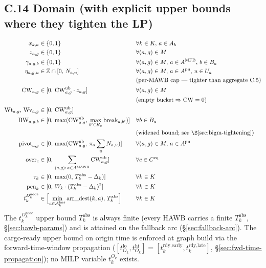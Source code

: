 \documentclass[11pt,a4paper]{article}
\theoremstyle{definition}
\begin{document}
\subsection*{C.14 Domain (with explicit upper bounds where they tighten the LP)}
\label{sec:domain}

\begin{align*}
  x_{k,a}      &\in \{0, 1\}                              & & \forall k \in K,\, a \in A_k \\
  z_{a,g}      &\in \{0, 1\}                              & & \forall (a, g) \in M \\
  \gamma_{a,g,b} &\in \{0, 1\}                            & & \forall (a, g) \in M,\, a \in A^{\text{MFB}},\, b \in B_a \\
  \eta_{a,g,u} &\in \mathbb{Z} \cap [0,\, N_{a,u}]        & & \forall (a, g) \in M,\, a \in A^{\text{pu}},\, u \in U_a \\
               & & & \text{(per-MAWB cap --- tighter than aggregate C.5)} \\
  \text{CW}_{a,g} &\in [0,\, \text{CW}^{\text{ub}}_{a,g} \cdot z_{a,g}] & & \forall (a, g) \in M \\
               & & & \text{(empty bucket} \Rightarrow \text{CW} = 0) \\
  \text{Wt}_{a,g},\,\text{Wv}_{a,g} &\in [0,\, \text{CW}^{\text{ub}}_{a,g}] & & \\
  \text{BW}_{a,g,b} &\in [0,\, \max(\text{CW}^{\text{ub}}_{a,g},\, \max_{b' \in B_a} \text{break}_{a,b'})] & & \forall b \in B_a \\
                & & & \text{(widened bound; see \S\ref{sec:bigm-tightening})} \\
  \text{pivot}_{a,g} &\in [0,\, \max(\text{CW}^{\text{ub}}_{a,g},\, \pi_a \sum_u N_{a,u})] & & \forall (a, g) \in M,\, a \in A^{\text{pu}} \\
  \text{over}_c &\in [0,\, \sum_{(a,g) :\, a \in A_c^{\text{MAWB}}} \text{CW}^{\text{ub}}_{a,g}] & & \forall c \in C^{\text{eq}} \\
  \tau_k        &\in [0,\, \max(0,\, T_k^{\text{abs}} - \Delta_k)] & & \forall k \in K \\
  \text{pen}_k  &\in [0,\, W_k \cdot (T_k^{\text{abs}} - \Delta_k)^2] & & \forall k \in K \\
  t_k^{D_k^{\text{node}}} &\in \Bigl[\min_{a \in \mathcal{A}^{\text{last}}_k} \text{arr\_dest}(k, a),\, T_k^{\text{abs}}\Bigr] & & \forall k \in K
\end{align*}
The $t_k^{D_k^{\text{node}}}$ upper bound $T_k^{\text{abs}}$ is always finite
(every HAWB carries a finite $T_k^{\text{abs}}$, \S\ref{sec:hawb-params})
and is attained on the fallback arc (\S\ref{sec:fallback-arc}). The
cargo-ready upper bound on origin time is enforced at graph build via the
forward-time-window propagation
($[t^{\text{lo}}_{O_k}, t^{\text{hi}}_{O_k}] = [t_k^{\text{rdy,early}},
t_k^{\text{rdy,late}}]$, \S\ref{sec:fwd-time-propagation}); no MILP variable
$t_k^{O_k}$ exists.
\end{document}
